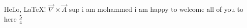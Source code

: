 \documentclass{article}
\begin{document}
Hello, \LaTeX!
$\vec{\nabla} \times \vec{A}$
\newline sup i am mohammed
\newline i am happy to welcome all of you to here $\frac{5}{4}$
\end{document}

